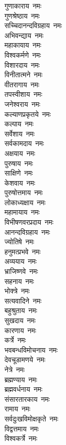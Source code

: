 \begin{multicols}{2}
\begin{flushleft}
गुणाकाराय~नमः\\
गुणश्रेष्ठाय~नमः\\
सच्चिदानन्दविग्रहाय~नमः\\
अभिवन्द्याय~नमः\\
महाकायाय~नमः\\
विश्वकर्मणे~नमः\\
विशारदाय~नमः\\
विनीतात्मने~नमः\hfill{}\\
वीतरागाय~नमः\\
तपस्वीशाय~नमः\\
जनेश्वराय~नमः\\
कल्याणप्रकृतये~नमः\\
कल्पाय~नमः\\
सर्वेशाय~नमः\\
सर्वकामदाय~नमः\\
अक्षयाय~नमः\\
पुरुषाय~नमः\\
साक्षिणे~नमः\hfill{}\\
केशवाय~नमः\\
पुरुषोत्तमाय~नमः\\
लोकाध्यक्षाय~नमः\\
महामायाय~नमः\\
विभीषणवरप्रदाय~नमः\\
आनन्दविग्रहाय~नमः\\
ज्योतिषे~नमः\\
हनुमत्प्रभवे~नमः\\
अव्ययाय~नमः\\
भ्राजिष्णवे~नमः\hfill{}\\
सहनाय~नमः\\
भोक्त्रे~नमः\\
सत्यवादिने~नमः\\
बहुश्रुताय~नमः\\
सुखदाय~नमः\\
कारणाय~नमः\\
कर्त्रे~नमः\\
भवबन्धविमोचनाय~नमः\\
देवचूडामणये~नमः\\
नेत्रे~नमः\hfill{}\\
ब्रह्मण्याय~नमः\\
ब्रह्मवर्धनाय~नमः\\
संसारतारकाय~नमः\\
रामाय~नमः\\
सर्वदुःखविमोक्षकृते~नमः\\
विद्वत्तमाय~नमः\\
विश्वकर्त्रे~नमः\\

\end{flushleft}
\end{multicols}
